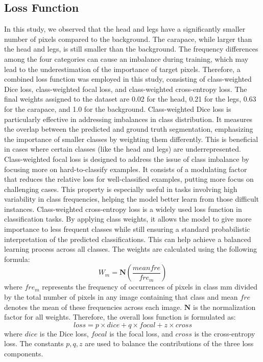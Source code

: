 \documentclass[conference]{IEEEtran}
\begin{document}
\subsection{Loss Function}
In this study, we observed that the head and legs have a significantly smaller number of pixels compared to the background. The carapace, while larger than the head and legs, is still smaller than the background. The frequency differences among the four categories can cause an imbalance during training, which may lead to the underestimation of the importance of target pixels. Therefore, a combined loss function was employed in this study, consisting of class-weighted Dice loss, class-weighted focal loss, and class-weighted cross-entropy loss. The final weights assigned to the dataset are 0.02 for the head, 0.21 for the legs, 0.63 for the carapace, and 1.0 for the background.
Class-weighted Dice loss is particularly effective in addressing imbalances in class distribution. It measures the overlap between the predicted and ground truth segmentation, emphasizing the importance of smaller classes by weighting them differently. This is beneficial in cases where certain classes (like the head and legs) are underrepresented.
Class-weighted focal loss is designed to address the issue of class imbalance by focusing more on hard-to-classify examples. It consists of a modulating factor that reduces the relative loss for well-classified examples, putting more focus on challenging cases. This property is especially useful in tasks involving high variability in class frequencies, helping the model better learn from those difficult instances.
Class-weighted cross-entropy loss is a widely used loss function in classification tasks. By applying class weights, it allows the model to give more importance to less frequent classes while still ensuring a standard probabilistic interpretation of the predicted classifications. This can help achieve a balanced learning process across all classes.
The weights are calculated using the following formula:
$$
W_m=\mathbf{N}(\frac{mean fre}{fre_m })
$$
where $fre_m$ represents the frequency of occurrences of pixels in class mm divided by the total number of pixels in any image containing that class and mean $fre$  denotes the mean of these frequencies across each image. $\mathbf{N}$ is the normalization factor for all weights. Therefore, the overall loss function is formulated as:
$$
loss=p\times dice+q\times focal+z\times cross
$$
where $dice$ is the Dice loss, $focal$ is the focal loss, and $cross$ is the cross-entropy loss. The constants $p,q,z$ are used to balance the contributions of the three loss components.
\end{document}
